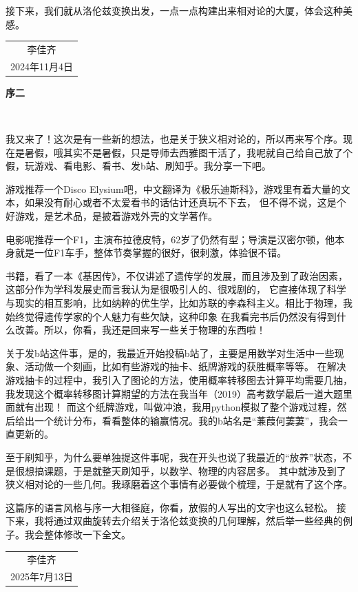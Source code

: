 \documentclass[12pt, a4paper, oneside]{ctexbook}
\begin{document}
接下来，我们就从洛伦兹变换出发，一点一点构建出来相对论的大厦，体会这种美感。
~\\
\begin{flushright}
	\begin{tabular}{c}
		李佳齐\\
		2024年11月4日
	\end{tabular}
\end{flushright}


\newpage
\begin{center}
	\Huge\textbf{序二}
\end{center}~\

我又来了！这次是有一些新的想法，也是关于狭义相对论的，所以再来写个序。现在是暑假，哦其实不是暑假，只是导师去西雅图干活了，我呢就自己给自己放了个假，玩游戏、看电影、看书、发b站、刷知乎。我分享一下吧。\par 
游戏推荐一个Disco Elysium吧，中文翻译为《极乐迪斯科》，游戏里有着大量的文本，如果没有耐心或者不太爱看书的话估计还真玩不下去，
但不得不说，这是个好游戏，是艺术品，是披着游戏外壳的文学著作。\par
电影呢推荐一个F1，主演布拉德皮特，62岁了仍然有型；导演是汉密尔顿，他本身就是一位F1车手，整体节奏掌握的很好，很刺激，体验很不错。 \par 
书籍，看了一本《基因传》，不仅讲述了遗传学的发展，而且涉及到了政治因素，这部分作为学科发展史而言我认为是很吸引人的、很戏剧的，
它直接体现了科学与现实的相互影响，比如纳粹的优生学，比如苏联的李森科主义。相比于物理，我始终觉得遗传学家的个人魅力有些欠缺，这种印象
在我看完书后仍然没有得到什么改善。所以，你看，我还是回来写一些关于物理的东西啦！\par 
关于发b站这件事，是的，我最近开始投稿b站了，主要是用数学对生活中一些现象、活动做一个刻画，比如有些游戏的抽卡、纸牌游戏的获胜概率等等。
在解决游戏抽卡的过程中，我引入了图论的方法，使用概率转移图去计算平均需要几抽，我发现这个概率转移图计算期望的方法在我当年（2019）高考数学最后一道大题里面就有出现！
而这个纸牌游戏，叫做冲浪，我用python模拟了整个游戏过程，然后给出一个统计分布，看看整体的输赢情况。我的b站名是“蒹葭何萋萋”，我会一直更新的。 \par 
至于刷知乎，为什么要单独提这件事呢，我在开头也说了我最近的“放养”状态，不是很想搞课题，于是就整天刷知乎，以数学、物理的内容居多。
其中就涉及到了狭义相对论的一些几何。我琢磨着这个事情有必要做个梳理，于是就有了这个序。 \par 
这篇序的语言风格与序一大相径庭，你看，放假的人写出的文字也这么轻松。
接下来，我将通过双曲旋转去介绍关于洛伦兹变换的几何理解，然后举一些经典的例子。我会整体修改一下全文。
~\\
\begin{flushright}
	\begin{tabular}{c}
		李佳齐\\
		2025年7月13日
	\end{tabular}
\end{flushright}
\end{document}
